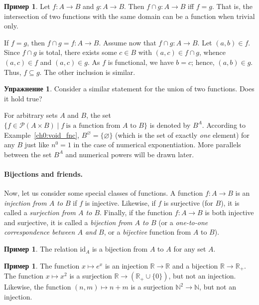 \documentclass[12pt,notitlepage]{article}
\theoremstyle{plain}
\theoremstyle{definition}
\newtheorem{exc}[thm]{Упражнение}
\newtheorem{exm}[thm]{Пример}
\theoremstyle{plain}
\newcommand{\N}{\mathbb{N}}
\newcommand{\R}{\mathbb{R}}
\newcommand{\sbs}{\subseteq}
\newcommand{\void}{\varnothing}
\newcommand{\mP}{\mathcal{P}}
\newcommand{\id}{\mathrm{id}}
\newcommand{\1}{\mathbf{1}}
\newcommand{\0}{\mathbf{0}}
\begin{document}
\begin{exm}
	Let $f\colon A \to B$ and $g\colon A \to B$. Then ${f \cap g}\colon A \to B$ iff $f = g$. That is, the intersection of two functions with the same domain can be a function when trivial only.
	
	If $f = g$, then $f \cap g = f \colon A \to B$. Assume now that ${f \cap g}\colon A \to B$. Let $(a,b) \in f$. Since $f \cap g$ is total, there exists some $c \in B$ with $(a,c) \in f \cap g$, whence $(a,c) \in f$ and $(a,c) \in g$. As $f$ is functional, we have $b = c$; hence, $(a,b) \in g$. Thus, $f \sbs g$. The other inclusion is similar.
\end{exm}

\begin{exc}
	Consider a similar statement for the union of two functions. Does it hold true?
\end{exc}

For arbitrary sets $A$ and $B$, the set $\{ f \in \mP(A \times B) \mid f\ \mbox{is a function from $A$ to $B$}\}$ is denoted by $B^A$. According to Example~\ref{ch0:void_fnc}, $B^\void = \{ \void \}$ (which is the set of exactly \emph{one} element) for any $B$ just like $n^0 = 1$ in the case of numerical exponentiation. More parallels between the set $B^A$ and numerical powers will be drawn later.

\paragraph{Bijections and friends.} Now, let us consider some special classes of functions. A function $f\colon A \to B$ is an \emph{injection from $A$ to $B$} if $f$ is injective. Likewise, if $f$ is surjective (for $B$), it is called a \emph{surjection from $A$ to $B$}. Finally, if the function $f\colon A \to B$ is both injective and surjective, it is called a \emph{bijection from $A$ to $B$} (or a \emph{one-to-one correspondence between $A$ and $B$}, or a \emph{bijective} function from $A$ to $B$).

\begin{exm}
	The relation $\id_A$ is a bijection from $A$ to $A$ for any set $A$.
\end{exm}

\begin{exm}
	The function $x \mapsto e^x$ is an injection $\R \to \R$ and a bijection $\R \to \R_+$. The function $x \mapsto x^2$ is a surjection $\R \to (\R_+ \cup \{0\})$, but not an injection. Likewise, the function $(n,m) \mapsto n + m$ is a surjection $\N^2 \to \N$, but not an injection. 
\end{exm}
\end{document}

